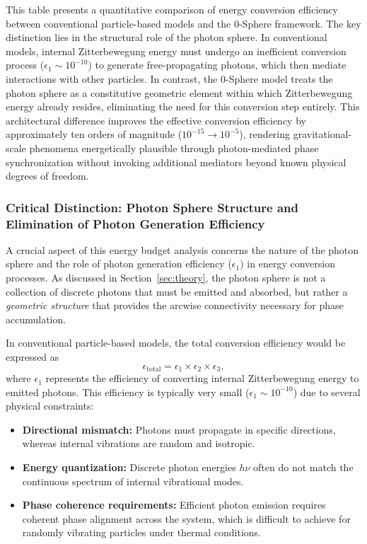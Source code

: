 \documentclass[
 reprint,
 amsmath,amssymb,
 aps,
 prb,
]{revtex4-2}
\numberwithin{equation}{section}
\begin{document}
\begin{table}[th!]
\begin{minipage}{0.95\textwidth}
\justifying\small
This table presents a quantitative comparison of energy conversion efficiency between conventional particle-based models and the 0-Sphere framework. The key distinction lies in the structural role of the photon sphere. In conventional models, internal Zitterbewegung energy must undergo an inefficient conversion process ($\epsilon_1 \sim 10^{-10}$) to generate free-propagating photons, which then mediate interactions with other particles. In contrast, the 0-Sphere model treats the photon sphere as a constitutive geometric element within which Zitterbewegung energy already resides, eliminating the need for this conversion step entirely. This architectural difference improves the effective conversion efficiency by approximately ten orders of magnitude ($10^{-15} \rightarrow 10^{-5}$), rendering gravitational-scale phenomena energetically plausible through photon-mediated phase synchronization without invoking additional mediators beyond known physical degrees of freedom.
\end{minipage}
\end{table}

\subsubsection{Critical Distinction: Photon Sphere Structure and Elimination of Photon Generation Efficiency}

A crucial aspect of this energy budget analysis concerns the nature of the photon sphere and the role of photon generation efficiency ($\epsilon_1$) in energy conversion processes. As discussed in Section~\ref{sec:theory}, the photon sphere is not a collection of discrete photons that must be emitted and absorbed, but rather a \textit{geometric structure} that provides the arcwise connectivity necessary for phase accumulation.

In conventional particle-based models, the total conversion efficiency would be expressed as
\begin{equation}
\epsilon_{\text{total}} = \epsilon_1 \times \epsilon_2 \times \epsilon_3,
\end{equation}
where $\epsilon_1$ represents the efficiency of converting internal Zitterbewegung energy to emitted photons. This efficiency is typically very small ($\epsilon_1 \sim 10^{-10}$) due to several physical constraints:

\begin{itemize}
\item \textbf{Directional mismatch:} Photons must propagate in specific directions, whereas internal vibrations are random and isotropic.
\item \textbf{Energy quantization:} Discrete photon energies $h\nu$ often do not match the continuous spectrum of internal vibrational modes.
\item \textbf{Phase coherence requirements:} Efficient photon emission requires coherent phase alignment across the system, which is difficult to achieve for randomly vibrating particles under thermal conditions.
\end{itemize}
\end{document}
